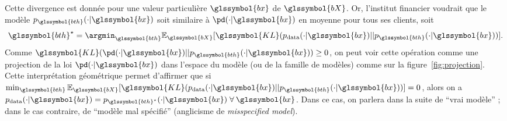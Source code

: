 Cette divergence est donnée pour une valeur particulière $\glssymbol{bx}$ de $\glssymbol{bX}$. Or, l'institut financier voudrait que le modèle $p_{\glssymbol{bth}}(\cdot | \glssymbol{bx})$ soit similaire à $\pd(\cdot | \glssymbol{bx})$ en moyenne pour tous ses clients, soit $${\glssymbol{bth}}^\star = \argmin_{\glssymbol{bth}} \mathbb{E}_{\glssymbol{bX}} [\glssymbol{KL}(p_{\text{data}}(\cdot | \glssymbol{bx})||p_{\glssymbol{bth}}(\cdot | \glssymbol{bx}))].$$ Comme $\glssymbol{KL}(\pd(\cdot | \glssymbol{bx})||p_{\glssymbol{bth}}(\cdot | \glssymbol{bx})) \geq 0$, on peut voir cette opération comme une projection de la loi $\pd(\cdot | \glssymbol{bx})$ dans l'espace du modèle (ou de la famille de modèles) comme sur la figure~\ref{fig:projection}. Cette interprétation géométrique permet d'affirmer que si $\min_{\glssymbol{bth}} \mathbb{E}_{\glssymbol{bX}} [\glssymbol{KL}(p_{\text{data}}(\cdot | \glssymbol{bx})||p_{\glssymbol{bth}}(\cdot | \glssymbol{bx}))] = 0$, alors on a $p_{\text{data}}(\cdot | \glssymbol{bx}) = p_{\glssymbol{bth}^\star}(\cdot | \glssymbol{bx}) \; \forall \: \glssymbol{bx}$. Dans ce cas, on parlera dans la suite de ``vrai modèle'' ; dans le cas contraire, de ``modèle mal spécifié'' (anglicisme de \textit{misspecified model}).

